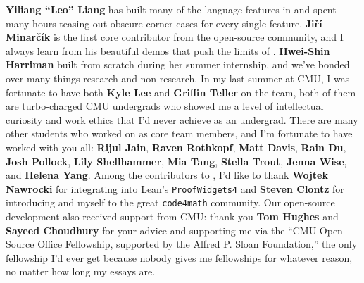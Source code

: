 \textbf{Yiliang ``Leo'' Liang} has built many of the language features in \Penrose and spent many hours teasing out obscure corner cases for every single feature. \textbf{Ji\v{r}\'{i} Minar\v{c}\'{i}k} is the first core contributor from the open-source community, and I always learn from his beautiful demos that push the limits of \Penrose. \textbf{Hwei-Shin Harriman} built \Edgeworth from scratch during her summer internship, and we've bonded over many things research and non-research. In my last summer at CMU, I was fortunate to have both \textbf{Kyle Lee} and \textbf{Griffin Teller} on the \Penrose team, both of them are turbo-charged CMU undergrads who showed me a level of intellectual curiosity and work ethics that I'd never achieve as an undergrad. There are many other students who worked on \Penrose as core team members, and I'm fortunate to have worked with you all: \textbf{Rijul Jain}, \textbf{Raven Rothkopf}, \textbf{Matt Davis}, \textbf{Rain Du}, \textbf{Josh Pollock}, \textbf{Lily Shellhammer}, \textbf{Mia Tang}, \textbf{Stella Trout}, \textbf{Jenna Wise}, and \textbf{Helena Yang}. Among the contributors to \Penrose, I'd like to thank \textbf{Wojtek Nawrocki} for integrating \Penrose into Lean's \texttt{ProofWidgets4} and \textbf{Steven Clontz} for introducing \Penrose and myself to the great \texttt{code4math} community. Our open-source development also received support from CMU: thank you \textbf{Tom Hughes} and \textbf{Sayeed Choudhury} for your advice and supporting me via the ``CMU Open Source Office Fellowship, supported by the Alfred P. Sloan Foundation,'' the only fellowship I'd ever get because nobody gives me fellowships for whatever reason, no matter how long my essays are. 

